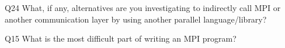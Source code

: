 \begin{description}%
\item{Q24} What, if any, alternatives are you investigating to indirectly call MPI or another communication layer by using another parallel language/library?%
\item{Q15} What is the most difficult part of writing an MPI program?%
\end{description}%
